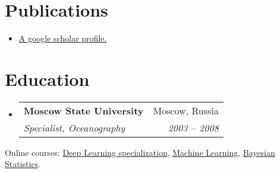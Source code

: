 \documentclass[letterpaper,11pt]{article}
\makeatletter
\newcommand{\resumePubItem}[2]{
  \item\small{
    \textbf{#1}{ #2 \vspace{-2pt}}
  }
}
\newcommand{\resumeSubheading}[4]{
  \vspace{-1pt}\item
    \begin{tabular*}{0.97\textwidth}[t]{l@{\extracolsep{\fill}}r}
      \textbf{#1} & #2 \\
      \textit{\small#3} & \textit{\small #4} \\
    \end{tabular*}\vspace{+1pt}
}
\newcommand{\resumeSubHeadingListStart}{\begin{itemize}[leftmargin=*]}
\newcommand{\resumeSubHeadingListEnd}{\end{itemize}}
\makeatother
\begin{document}
\section{Publications}
  \resumeSubHeadingListStart
    \resumePubItem{}
      {\href{https://scholar.google.com/citations?hl=en&user=72diaAiPvoYC&view_op=list_works&sortby=pubdate}{A google scholar profile.}}
  \resumeSubHeadingListEnd

\section{Education}
  \resumeSubHeadingListStart
    \resumeSubheading
      {Moscow State University}{Moscow, Russia}
      {Specialist, Oceanography}{2003 -- 2008}
  \resumeSubHeadingListEnd
  
  Online courses:
  {\href{https://coursera.org/share/738f07c3514e74b4b4a2ec4c7df53d11}{Deep Learning specialization},
   \href{https://coursera.org/share/a7e216966ca1e16fd6c58b7d58cb0806}{Machine Learning},
   \href{https://coursera.org/share/2a20ba63d42f5a2557db34e3e9837382}{Bayesian Statistics}.}

\end{document}
